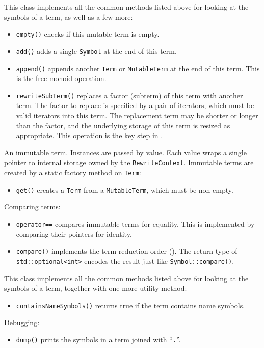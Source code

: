 \documentclass[../generics]{subfiles}
\begin{document}
This class implements all the common methods listed above for looking at the symbols of a term, as well as a few more:
\begin{itemize}
\item \texttt{empty()} checks if this mutable term is empty.
\item \texttt{add()} adds a single \texttt{Symbol} at the end of this term.
\item \texttt{append()} appends another \texttt{Term} or \texttt{MutableTerm} at the end of this term. This is the free monoid operation.
\item \texttt{rewriteSubTerm()} replaces a factor (subterm) of this term with another term. The factor to replace is specified by a pair of iterators, which must be valid iterators into this term. The replacement term may be shorter or longer than the factor, and the underlying storage of this term is resized as appropriate. This operation is the key step in .
\end{itemize}

An immutable term. Instances are passed by value. Each value wraps a single pointer to internal storage owned by the \texttt{RewriteContext}. Immutable terms are created by a static factory method on \texttt{Term}:
\begin{itemize}
\item \texttt{get()} creates a \texttt{Term} from a \texttt{MutableTerm}, which must be non-empty.
\end{itemize}
Comparing terms:
\begin{itemize}
\item \texttt{operator==} compares immutable terms for equality. This is implemented by comparing their pointers for identity.
\item \texttt{compare()} implements the term reduction order (). The return type of \texttt{std::optional<int>} encodes the result just like \texttt{Symbol::compare()}.
\end{itemize}
This class implements all the common methods listed above for looking at the symbols of a term, together with one more utility method:
\begin{itemize}
\item \texttt{containsNameSymbols()} returns true if the term contains name symbols.
\end{itemize}
Debugging:
\begin{itemize}
\item \texttt{dump()} prints the symbols in a term joined with ``\texttt{.}''.
\end{itemize}
\end{document}

